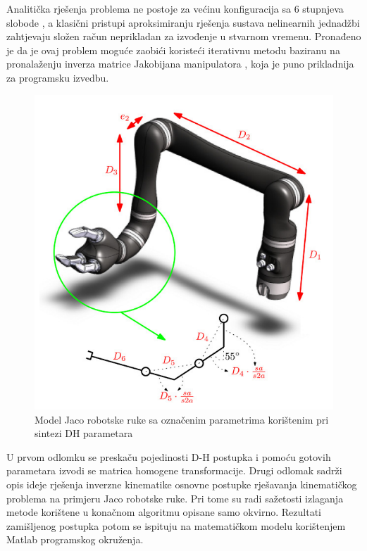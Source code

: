 \documentclass[times, utf8, diplomski, numeric]{fer}
\begin{document}
Analitička rješenja problema ne postoje za većinu konfiguracija sa 6 stupnjeva slobode \cite{grochow2004style}, a klasični pristupi aproksimiranju rješenja sustava nelinearnih jednadžbi \cite{broyden1965class}\cite{bi2009three} zahtjevaju složen račun neprikladan za izvođenje u stvarnom vremenu.
Pronađeno je da je ovaj problem moguće zaobići koristeći iterativnu metodu baziranu na pronalaženju inverza matrice Jakobijana manipulatora \cite{buss2004introduction}, koja je puno prikladnija za programsku izvedbu.
\begin{figure}[h!]
\centering
\includegraphics[scale=0.35]{jacoDH1}
\caption{Model Jaco robotske ruke sa označenim parametrima korištenim pri sintezi DH parametara} \label{jacoparam}
\end{figure}

U prvom odlomku se preskaču pojedinosti D-H postupka i pomoću gotovih parametara izvodi se matrica homogene transformacije.
Drugi odlomak sadrži opis ideje rješenja inverzne kinematike osnovne postupke rješavanja kinematičkog problema na primjeru Jaco robotske ruke.
Pri tome su radi sažetosti izlaganja metode korištene u konačnom algoritmu opisane samo okvirno.
Rezultati zamišljenog postupka potom se ispituju na matematičkom modelu korištenjem Matlab programskog okruženja.
\end{document}
